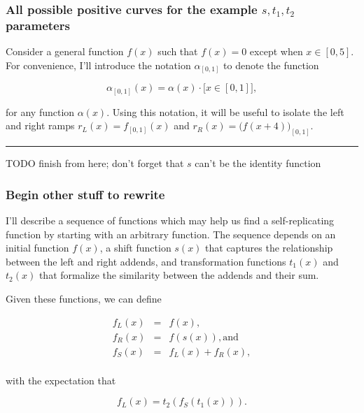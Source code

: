 \documentclass[]{article}
\begin{document}
\subsubsection{\texorpdfstring{All possible positive curves for the
example \(s,t_1,t_2\)
parameters}{All possible positive curves for the example s,t\_1,t\_2 parameters}}\label{all-possible-positive-curves-for-the-example-stux5f1tux5f2-parameters}

Consider a general function \(f(x)\) such that \(f(x)=0\) except when
\(x \in [0, 5]\). For convenience, I'll introduce the notation
\(\alpha_{[0,1]}\) to denote the function

\[\alpha_{[0,1]}(x) = \alpha(x) \cdot \big[ x\in [0,1] \big],\]

for any function \(\alpha(x)\). Using this notation, it will be useful
to isolate the left and right ramps \(r_L(x) = f_{[0,1]}(x)\) and
\(r_R(x) = \big(f(x + 4)\big)_{[0,1]}\).

\begin{center}\rule{0.5\linewidth}{\linethickness}\end{center}

TODO finish from here; don't forget that \(s\) can't be the identity
function

\subsubsection{Begin other stuff to
rewrite}\label{begin-other-stuff-to-rewrite}

I'll describe a sequence of functions which may help us find a
self-replicating function by starting with an arbitrary function. The
sequence depends on an initial function \(f(x)\), a shift function
\(s(x)\) that captures the relationship between the left and right
addends, and transformation functions \(t_1(x)\) and \(t_2(x)\) that
formalize the similarity between the addends and their sum.

Given these functions, we can define

\[\begin{array}{rcl}
  f_L(x) & = & f(x), \\
  f_R(x) & = & f(s(x)), \text{and} \\
  f_S(x) & = & f_L(x) + f_R(x), \\
\end{array}\]

with the expectation that

\[f_L(x) = t_2(f_S(t_1(x))).\]
\end{document}
